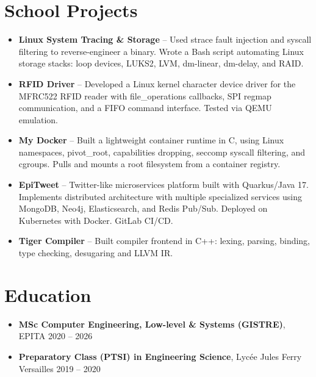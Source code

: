 \documentclass[9pt,a4paper]{article}
\begin{document}
\section*{School Projects}
\begin{tcolorbox}[mybox]
\begin{itemize}
\item \textbf{Linux System Tracing \& Storage} -- Used strace fault injection and syscall filtering to reverse-engineer a binary. Wrote a Bash script automating Linux storage stacks: loop devices, LUKS2, LVM, dm-linear, dm-delay, and RAID.

\item \textbf{RFID Driver} -- Developed a Linux kernel character device driver for the MFRC522 RFID reader with file\_operations callbacks, SPI regmap communication, and a FIFO command interface. Tested via QEMU emulation.

\item \textbf{My Docker} -- Built a lightweight container runtime in C, using Linux namespaces, pivot\_root, capabilities dropping, seccomp syscall filtering, and cgroups. Pulls and mounts a root filesystem from a container registry.

\item \textbf{EpiTweet} -- Twitter-like microservices platform built with Quarkus/Java 17. Implements distributed architecture with multiple specialized services using MongoDB, Neo4j, Elasticsearch, and Redis Pub/Sub. Deployed on Kubernetes with Docker. GitLab CI/CD.

\item \textbf{Tiger Compiler} -- Built compiler frontend in C++: lexing, parsing, binding, type checking, desugaring and LLVM IR.
\end{itemize}
\end{tcolorbox}


\section*{Education}
\begin{tcolorbox}[mybox]
\begin{itemize}
\item \textbf{MSc Computer Engineering, Low-level \& Systems (GISTRE)}, EPITA {\small{\hfill 2020 – 2026}}

\item \textbf{Preparatory Class (PTSI) in Engineering Science}, Lycée Jules Ferry Versailles {\small{\hfill 2019 – 2020}}
\end{itemize}
\end{tcolorbox}
\end{document}
